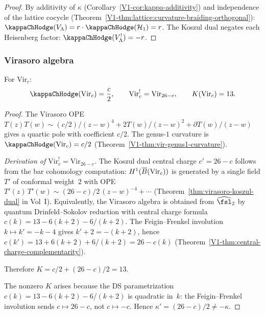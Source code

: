 \begin{proof}
By additivity of $\kappa$ (Corollary~\ref{V1-cor:kappa-additivity}) and
independence of the lattice cocycle
(Theorem~\ref{V1-thm:lattice:curvature-braiding-orthogonal}):
$\kappaChHodge(V_\Lambda) = r \cdot \kappaChHodge(\cH_1) = r$.
The Koszul dual negates each Heisenberg factor: $\kappaChHodge(V_\Lambda^!) = -r$.
\end{proof}

\subsubsection{Virasoro algebra}

\begin{theorem}
\label{thm:thqg-IV-virasoro-K}
For $\mathrm{Vir}_c$:
\begin{equation}%
\kappaChHodge(\mathrm{Vir}_c) = \frac{c}{2},
\qquad
\mathrm{Vir}_c^! = \mathrm{Vir}_{26-c},
\qquad
K(\mathrm{Vir}_c) = 13.
\end{equation}
\end{theorem}

\begin{proof}
The Virasoro OPE $T(z) T(w) \sim (c/2)/(z-w)^4 + 2T(w)/(z-w)^2
+ \partial T(w)/(z-w)$ gives a quartic pole with coefficient $c/2$.
The genus-$1$ curvature is $\kappaChHodge(\mathrm{Vir}_c) = c/2$
(Theorem~\ref{V1-thm:vir-genus1-curvature}).

\emph{Derivation of $\mathrm{Vir}_c^! = \mathrm{Vir}_{26-c}$.}
The Koszul dual central charge $c' = 26 - c$ follows from the bar
cohomology computation: $H^1(\overline{B}(\mathrm{Vir}_c))$ is generated
by a single field $T'$ of conformal weight~$2$ with OPE
$T'(z)\,T'(w) \sim (26-c)/2\,(z-w)^{-4} + \cdots$
(Theorem~\ref{thm:virasoro-koszul-dual} in Vol~I\@).
Equivalently, the Virasoro algebra is obtained from
$\widehat{\fsl}_2$ by quantum Drinfeld--Sokolov reduction with
central charge formula
$c(k) = 13 - 6(k+2) - 6/(k+2)$.
The Feigin--Frenkel involution $k \mapsto k' = -k - 4$ gives
$k' + 2 = -(k+2)$, hence
$c(k') = 13 + 6(k+2) + 6/(k+2) = 26 - c(k)$
(Theorem~\ref{V1-thm:central-charge-complementarity}).

Therefore
$K = c/2 + (26-c)/2 = 13$.

The nonzero $K$ arises because the DS parametrization
$c(k) = 13 - 6(k+2) - 6/(k+2)$ is quadratic in~$k$: the
Feigin--Frenkel involution sends $c \mapsto 26 - c$, not
$c \mapsto -c$. Hence
$\kappa' = (26-c)/2 \neq -\kappa$.
\end{proof}

